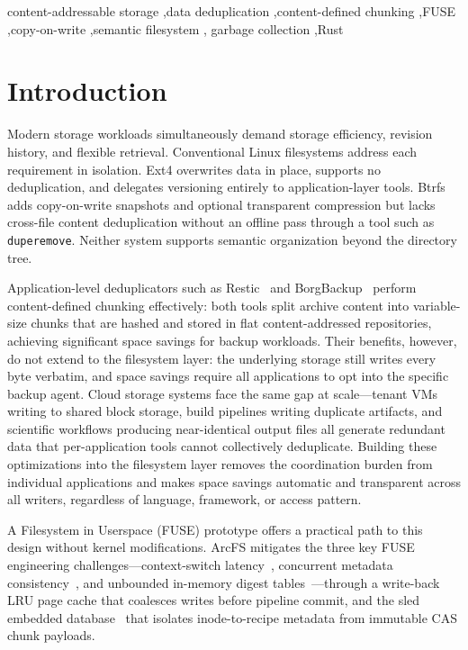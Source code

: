 \documentclass[5p,times]{elsarticle}
\begin{document}
\begin{frontmatter}
\begin{keyword}
content-addressable storage \sep data deduplication \sep content-defined
chunking \sep FUSE \sep copy-on-write \sep semantic filesystem \sep
garbage collection \sep Rust
\end{keyword}

\end{frontmatter}
\linenumbers

\section{Introduction}

Modern storage workloads simultaneously demand storage efficiency,
revision history, and flexible retrieval. Conventional Linux filesystems
address each requirement in isolation. Ext4 overwrites data in place,
supports no deduplication, and delegates versioning entirely to
application-layer tools. Btrfs adds copy-on-write snapshots and optional
transparent compression but lacks cross-file content deduplication
without an offline pass through a tool such as \texttt{duperemove}.
Neither system supports semantic organization beyond the directory tree.

Application-level deduplicators such as Restic~\cite{restic2024} and
BorgBackup~\cite{borgbackup2024} perform content-defined chunking
effectively: both tools split archive content into variable-size
chunks that are hashed and stored in flat content-addressed
repositories, achieving significant space savings for backup
workloads. Their benefits, however, do not extend to the filesystem
layer: the underlying storage still writes every byte verbatim, and
space savings require all applications to opt into the specific backup
agent. Cloud storage systems face the same gap at scale---tenant VMs
writing to shared block storage, build pipelines writing duplicate
artifacts, and scientific workflows producing near-identical output
files all generate redundant data that per-application tools cannot
collectively deduplicate. Building these optimizations into the
filesystem layer removes the coordination burden from individual
applications and makes space savings automatic and transparent across
all writers, regardless of language, framework, or access pattern.

A Filesystem in Userspace (FUSE) prototype offers a practical path to
this design without kernel modifications. ArcFS mitigates the three key
FUSE engineering challenges---context-switch latency~\cite{vangoor2017fuse},
concurrent metadata consistency~\cite{soules2003metadata}, and unbounded
in-memory digest tables~\cite{zhu2008dedup}---through a write-back LRU
page cache that coalesces writes before pipeline commit, and the sled
embedded database~\cite{sled2024} that isolates inode-to-recipe metadata
from immutable CAS chunk payloads.
\end{document}
